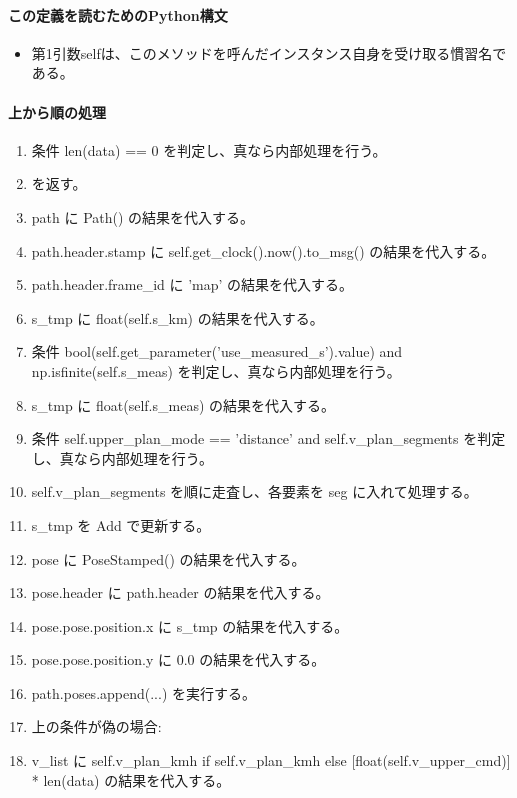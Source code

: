 \documentclass[a4paper,11pt]{article}
\begin{document}
            \paragraph{この定義を読むためのPython構文}
            \begin{itemize}[leftmargin=1.6em]
            \item 第1引数selfは、このメソッドを呼んだインスタンス自身を受け取る慣習名である。
            \end{itemize}
            \paragraph{上から順の処理}
            \begin{enumerate}[leftmargin=1.8em]
            \item 条件 len(data) == 0 を判定し、真なら内部処理を行う。
\item    を返す。
\item path に Path() の結果を代入する。
\item path.header.stamp に self.get\_clock().now().to\_msg() の結果を代入する。
\item path.header.frame\_id に 'map' の結果を代入する。
\item s\_tmp に float(self.s\_km) の結果を代入する。
\item 条件 bool(self.get\_parameter('use\_measured\_s').value) and np.isfinite(self.s\_meas) を判定し、真なら内部処理を行う。
\item   s\_tmp に float(self.s\_meas) の結果を代入する。
\item 条件 self.upper\_plan\_mode == 'distance' and self.v\_plan\_segments を判定し、真なら内部処理を行う。
\item   self.v\_plan\_segments を順に走査し、各要素を seg に入れて処理する。
\item     s\_tmp を Add で更新する。
\item     pose に PoseStamped() の結果を代入する。
\item     pose.header に path.header の結果を代入する。
\item     pose.pose.position.x に s\_tmp の結果を代入する。
\item     pose.pose.position.y に 0.0 の結果を代入する。
\item     path.poses.append(...) を実行する。
\item   上の条件が偽の場合:
\item   v\_list に self.v\_plan\_kmh if self.v\_plan\_kmh else [float(self.v\_upper\_cmd)] * len(data) の結果を代入する。

\end{enumerate}
\end{document}
